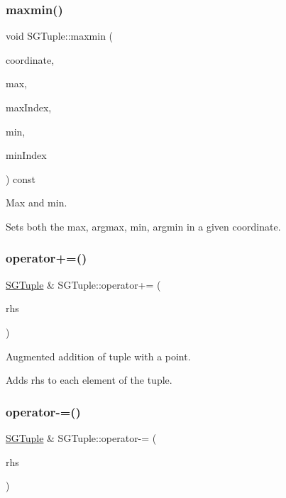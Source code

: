 \subsubsection{\texorpdfstring{maxmin()}{maxmin()}}
{\footnotesize\ttfamily void S\+G\+Tuple\+::maxmin (\begin{DoxyParamCaption}\item[{int}]{coordinate,  }\item[{double \&}]{max,  }\item[{int \&}]{max\+Index,  }\item[{double \&}]{min,  }\item[{int \&}]{min\+Index }\end{DoxyParamCaption}) const}



Max and min. 

Sets both the max, argmax, min, argmin in a given coordinate. \mbox{\label{classSGTuple_af3e77720996ec599cdffea08f92355ae}} 
\subsubsection{\texorpdfstring{operator+=()}{operator+=()}}
{\footnotesize\ttfamily \hyperlink{classSGTuple}{S\+G\+Tuple} \& S\+G\+Tuple\+::operator+= (\begin{DoxyParamCaption}\item[{const \hyperlink{classSGPoint}{S\+G\+Point} \&}]{rhs }\end{DoxyParamCaption})}



Augmented addition of tuple with a point. 

Adds rhs to each element of the tuple. \mbox{\label{classSGTuple_a2e6d730692fe4e702e021044dd9889a8}} 
\subsubsection{\texorpdfstring{operator-\/=()}{operator-=()}}
{\footnotesize\ttfamily \hyperlink{classSGTuple}{S\+G\+Tuple} \& S\+G\+Tuple\+::operator-\/= (\begin{DoxyParamCaption}\item[{const \hyperlink{classSGPoint}{S\+G\+Point} \&}]{rhs }\end{DoxyParamCaption})}



